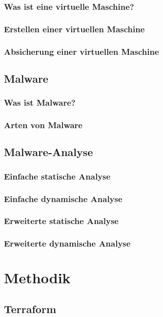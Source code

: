 \documentclass[12pt,oneside]{article}
\begin{document}
\subsubsection{Was ist eine virtuelle Maschine?}
\subsubsection{Erstellen einer virtuellen Maschine}
\subsubsection{Absicherung einer virtuellen Maschine}
\subsection{Malware}
\subsubsection{Was ist Malware?}
\subsubsection{Arten von Malware}
\subsection{Malware-Analyse}
\subsubsection{Einfache statische Analyse}
\subsubsection{Einfache dynamische Analyse}
\subsubsection{Erweiterte statische Analyse}
\subsubsection{Erweiterte dynamische Analyse}
\newpage

\section{Methodik}
\subsection{Terraform}
\end{document}
